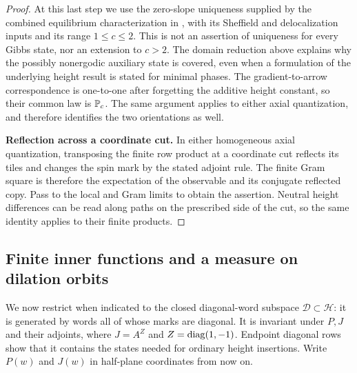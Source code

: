 \begin{proof}
At this last step we use the zero-slope uniqueness supplied by the
combined equilibrium characterization in \cite{DKLM2026}, with its
Sheffield and delocalization inputs and its range $1\le c\le2$.
This is not an assertion of uniqueness for every Gibbs state, nor an
extension to $c>2$.  The domain reduction above explains why the
possibly nonergodic auxiliary state is covered, even when a formulation
of the underlying height result is stated for minimal phases.
The gradient-to-arrow correspondence is one-to-one after forgetting
the additive height constant, so their common law is $\P_c$. The same
argument applies to either axial quantization, and therefore identifies
the two orientations as well.

\smallskip\noindent\textbf{Reflection across a coordinate cut.}
In either homogeneous axial quantization, transposing the
finite row product at a coordinate cut reflects its tiles and changes
the spin mark by the stated adjoint rule.  The finite Gram square is
therefore the expectation of the observable and its conjugate reflected
copy.  Pass to the local and Gram limits to obtain the assertion.
Neutral height differences can be read along paths on the prescribed
side of the cut, so the same identity applies to their finite products.
\end{proof}

\subsection{Finite inner functions and a measure on dilation orbits}

We now restrict when indicated to the closed diagonal-word subspace
$\mathcal D\subset\mathcal H$: it is generated by words all of whose
marks are diagonal.  It is invariant under $P,J$ and their adjoints,
where $J=A^Z$ and $Z=\diag(1,-1)$.  Endpoint diagonal rows show that it
contains the states needed for ordinary height insertions.  Write
$P(w)$ and $J(w)$ in half-plane coordinates from now on.


